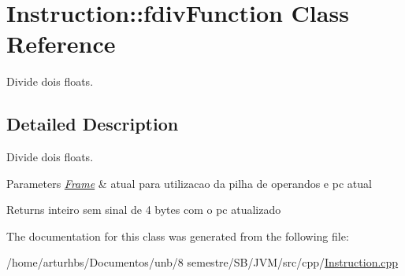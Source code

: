 \hypertarget{classInstruction_1_1fdivFunction}{}\section{Instruction\+:\+:fdiv\+Function Class Reference}
\label{classInstruction_1_1fdivFunction}


Divide dois floats.  




\subsection{Detailed Description}
Divide dois floats. 


\begin{DoxyParams}{Parameters}
{\em \hyperlink{classFrame}{Frame}} & atual para utilizacao da pilha de operandos e pc atual \\
\hline
\end{DoxyParams}
\begin{DoxyReturn}{Returns}
inteiro sem sinal de 4 bytes com o pc atualizado 
\end{DoxyReturn}


The documentation for this class was generated from the following file\+:\begin{DoxyCompactItemize}
\item 
/home/arturhbs/\+Documentos/unb/8 semestre/\+S\+B/\+J\+V\+M/src/cpp/\hyperlink{Instruction_8cpp}{Instruction.\+cpp}\end{DoxyCompactItemize}
